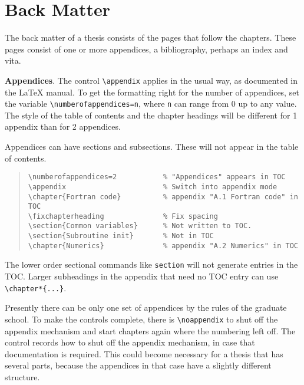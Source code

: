 \section{Back Matter}

The back matter of a thesis consists of the pages that follow the
chapters. These pages consist of one or more appendices,
a bibliography, perhaps an index and vita.

{\bf Appendices}.
The control \verb|\appendix| applies in the usual way, as documented in
the \LaTeX{} manual. To get the formatting right for the number of
appendices, set the variable \verb|\numberofappendices=n|, where
\verb|n| can range from 0 up to any value. The style of the table of
contents and the chapter headings will be different for 1 appendix than
for 2 appendices.

Appendices can have sections and subsections.
These will not appear in the table of contents.
\begin{quote}
\begin{verbatim}
\numberofappendices=2           % "Appendices" appears in TOC
\appendix                       % Switch into appendix mode
\chapter{Fortran code}          % appendix "A.1 Fortran code" in TOC
\fixchapterheading              % Fix spacing
\section{Common variables}      % Not written to TOC.
\section{Subroutine init}       % Not in TOC
\chapter{Numerics}              % appendix "A.2 Numerics" in TOC
\end{verbatim}
\end{quote}
The lower order sectional commands like {\tt section} will not generate
entries in the TOC. Larger subheadings in the appendix that need no TOC
entry can use \verb"\chapter*{...}".

Presently there can be only one set of appendices by the rules of the
graduate school. To make the controls complete, there is
\verb"\noappendix" to shut off the appendix mechanism and start chapters
again where the numbering left off. The control records how to shut off
the appendix mechanism, in case that documentation is required. This
could become necessary for a thesis that has several parts, because the
appendices in that case have a slightly different structure.

